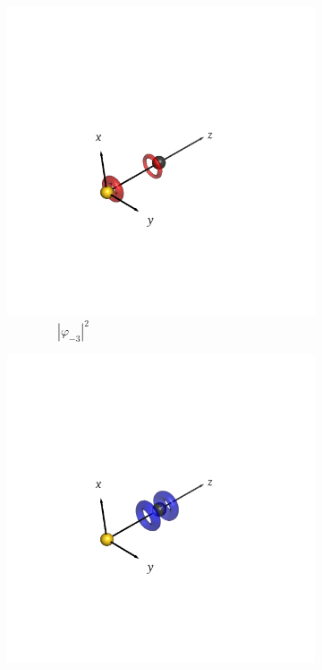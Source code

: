 \documentclass[journal=inoraj,manuscript=article]{achemso}
\begin{document}
\begin{figure}[!h]
    \vspace{0.0cm}
    \begin{subfigure}[t]{0.32\textwidth}
        \centering
        \includegraphics[width=\linewidth]{./AuCn+/nocv-5.png} 
        \caption*{\ \ \ \ \ \ \ \ $|\varphi_{-3}|^2$} 
    \end{subfigure}
    \hfill
    \begin{subfigure}[t]{0.32\textwidth}
        \centering
        \includegraphics[width=\linewidth]{./AuCn+/nocv+5.png} 

\end{subfigure}
\end{figure}
\end{document}
